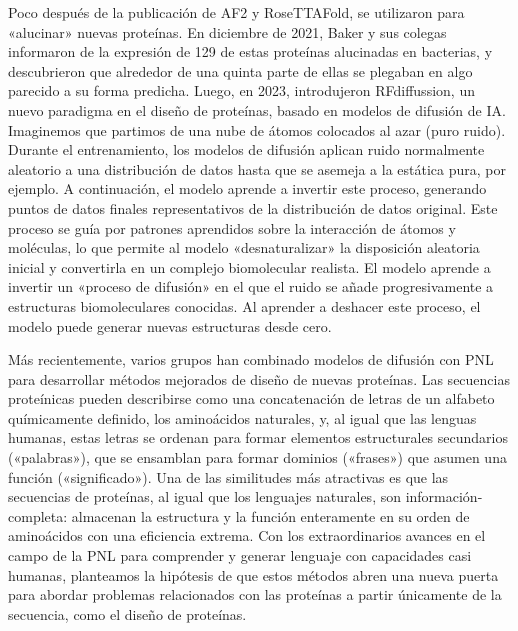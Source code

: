 Poco después de la publicación de AF2 y RoseTTAFold, se utilizaron para «alucinar» nuevas proteínas. En diciembre de 2021, Baker y sus colegas informaron de la expresión de 129 de estas proteínas alucinadas en bacterias, y descubrieron que alrededor de una quinta parte de ellas se plegaban en algo parecido a su forma predicha. Luego, en 2023, introdujeron RFdiffussion, un nuevo paradigma en el diseño de proteínas, basado en modelos de difusión de IA. Imaginemos que partimos de una nube de átomos colocados al azar (puro ruido). Durante el entrenamiento, los modelos de difusión aplican ruido normalmente aleatorio a una distribución de datos hasta que se asemeja a la estática pura, por ejemplo. A continuación, el modelo aprende a invertir este proceso, generando puntos de datos finales representativos de la distribución de datos original. Este proceso se guía por patrones aprendidos sobre la interacción de átomos y moléculas, lo que permite al modelo «desnaturalizar» la disposición aleatoria inicial y convertirla en un complejo biomolecular realista. El modelo aprende a invertir un «proceso de difusión» en el que el ruido se añade progresivamente a estructuras biomoleculares conocidas. Al aprender a deshacer este proceso, el modelo puede generar nuevas estructuras desde cero.

Más recientemente, varios grupos han combinado modelos de difusión con PNL para desarrollar métodos mejorados de diseño de nuevas proteínas. Las secuencias proteínicas pueden describirse como una concatenación de letras de un alfabeto químicamente definido, los aminoácidos naturales, y, al igual que las lenguas humanas, estas letras se ordenan para formar elementos estructurales secundarios («palabras»), que se ensamblan para formar dominios («frases») que asumen una función («significado»). Una de las similitudes más atractivas es que las secuencias de proteínas, al igual que los lenguajes naturales, son información-completa: almacenan la estructura y la función enteramente en su orden de aminoácidos con una eficiencia extrema. Con los extraordinarios avances en el campo de la PNL para comprender y generar lenguaje con capacidades casi humanas, planteamos la hipótesis de que estos métodos abren una nueva puerta para abordar problemas relacionados con las proteínas a partir únicamente de la secuencia, como el diseño de proteínas.

